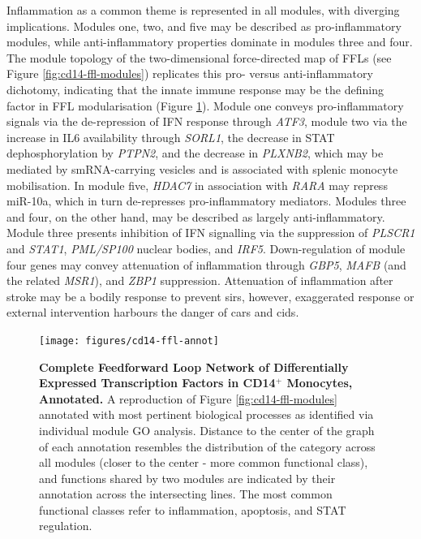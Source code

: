 Inflammation as a common theme is represented in all modules, with diverging implications. Modules one, two, and five may be described as pro-inflammatory modules, while anti-inflammatory properties dominate in modules three and four. The module topology of the two-dimensional force-directed map of FFLs (see Figure \ref{fig:cd14-ffl-modules}) replicates this pro- versus anti-inflammatory dichotomy, indicating that the innate immune response may be the defining factor in FFL modularisation (Figure \ref{fig:cd14-ffl-annot}). Module one conveys pro-inflammatory signals via the de-repression of IFN response through \emph{ATF3}, module two via the increase in IL6 availability through \emph{SORL1}, the decrease in STAT dephosphorylation by \emph{PTPN2}, and the decrease in \emph{PLXNB2}, which may be mediated by smRNA-carrying vesicles and is associated with splenic monocyte mobilisation. In module five, \emph{HDAC7} in association with \emph{RARA} may repress miR-10a, which in turn de-represses pro-inflammatory mediators. Modules three and four, on the other hand, may be described as largely anti-inflammatory. Module three presents inhibition of IFN signalling via the suppression of \emph{PLSCR1} and \emph{STAT1}, \emph{PML/SP100} nuclear bodies, and \emph{IRF5}. Down-regulation of module four genes may convey attenuation of inflammation through \emph{GBP5}, \emph{MAFB} (and the related \emph{MSR1}), and \emph{ZBP1} suppression. Attenuation of inflammation after stroke may be a bodily response to prevent \acf{sirs}, however, exaggerated response or external intervention harbours the danger of \acf{cars} and \acf{cids}.

\begin{figure}[t]
\texttt{[image: figures/cd14-ffl-annot]}
\caption[Complete Feedforward Loop Network of Differentially Expressed Transcription Factors in CD14$^+$ Monocytes, Annotated.]{\textbf{Complete Feedforward Loop Network of Differentially Expressed Transcription Factors in CD14$^+$ Monocytes, Annotated.}  A reproduction of Figure \ref{fig:cd14-ffl-modules} annotated with most pertinent biological processes as identified via individual module GO analysis. Distance to the center of the graph of each annotation resembles the distribution of the category across all modules (closer to the center - more common functional class), and functions shared by two modules are indicated by their annotation across the intersecting lines. The most common functional classes refer to inflammation, apoptosis, and STAT regulation.
\label{fig:cd14-ffl-annot}}
\end{figure}


